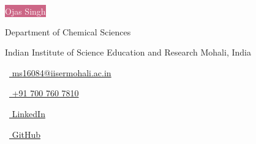 \begin{scriptsize}
\end{scriptsize}

\vspace*{-0.10em}
\begin{Large} 
	\colorbox[HTML]{cc6686}{\textrm{\Huge \textcolor[HTML]{ffffff}{Ojas Singh}}}
\end{Large}

\vspace*{0.25em}
\begin{scshape}
	\begin{footnotesize}
		  \textcolor{highlight2}{Department of Chemical Sciences }
		  
		  \vspace*{-1ex}
		  \textcolor{highlight2}{Indian Institute of Science Education and Research Mohali, India}
	\end{footnotesize}
\end{scshape}
\vspace*{0.4cm}

\begin{footnotesize}
	\quad \begin{tiny}\faEnvelope[regular]\end{tiny}~\href{mailto:ms16084@iisermohali.ac.in}{%
		ms16084@iisermohali.ac.in
	} 
	
	\begin{tiny}\faMobile*\end{tiny}~\href{tel:+91 700 760 7810  }{
		+91 700 760 7810 
	} 
	\quad 
	\begin{tiny}\faLinkedinIn\end{tiny}~\href{https://www.linkedin.com/in/ojas-singh-192477200/}{
		LinkedIn
	}
	\quad 
	\begin{tiny}\faGithub\end{tiny}~\href{https://github.com/Ojas-Singh}{
		 GitHub
		}

\end{footnotesize}